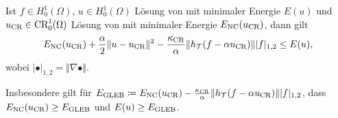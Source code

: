 \begin{theorem}
  \label{thm:gleb}
  Ist $f\in H^1_0(\Omega)$, $u\in H^1_0(\Omega)$ Lösung von
   mit minimaler Energie $E(u)$ und $u_\textup{CR}\in
  \textup{CR}^1_0(\Omega)$ Lösung von  mit minimaler Energie
  $E_\textup{NC}(u_\textup{CR})$, dann gilt
  \begin{align}
    \label{eq:gleb}
    E_\textup{NC}(u_\textup{CR})+\frac{\alpha}{2}\Vert u-u_\textup{CR}\Vert^2
    -\frac{\kappa_{\textup{CR}}}{\alpha}\Vert
    h_{\mathcal{T}}(f-\alpha u_\textup{CR})\Vert |f|_{1,2}\leq E(u),
  \end{align}
  wobei $|\bullet|_{1,2}=\Vert\nabla \bullet\Vert$.
  
  Insbesondere gilt für 
  $E_\textup{GLEB} \coloneqq 
    E_\textup{NC}(u_\textup{CR}) - \frac{\kappa_{\textup{CR}}}{\alpha}\Vert
    h_{\mathcal{T}}(f-\alpha u_\textup{CR})\Vert |f|_{1,2}$, dass
    $E_\textup{NC}(u_\textup{CR})\geq E_\textup{GLEB}$ und $E(u)\geq E_\textup{GLEB}$.
\end{theorem}
